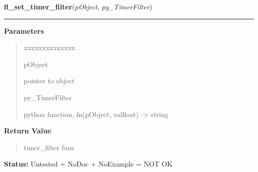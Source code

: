 \hspace{.8\funcindent}\begin{boxedminipage}{\funcwidth}

    \raggedright \textbf{fl\_set\_timer\_filter}(\textit{pObject}, \textit{py\_TimerFilter})

    \vspace{-1.5ex}

    \rule{\textwidth}{0.5\fboxrule}
\setlength{\parskip}{2ex}
\setlength{\parskip}{1ex}
      \textbf{Parameters}
      \vspace{-1ex}

      \begin{quote}
        \begin{Ventry}{xxxxxxxxxxxxxx}

          \item[pObject]

          pointer to object

          \item[py\_TimerFilter]

          python function, fn(pObject, valfloat) -{\textgreater} string

        \end{Ventry}

      \end{quote}

      \textbf{Return Value}
    \vspace{-1ex}

      \begin{quote}
      timer\_filter func

      \end{quote}

\textbf{Status:} Untested + NoDoc + NoExample = NOT OK



    \end{boxedminipage}

    \label{xformslib:library:fl_suspend_timer}

    \vspace{0.5ex}

